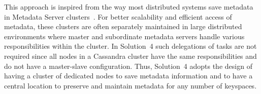  
 This approach is inspired from the way most distributed systems save metadata
 in Metadata Server clusters~\citep{bin-et-al, Fu, lin}. 
 For better scalability and efficient access of metadata,   these clusters are
 often separately maintained in large distributed environments where  master
 and subordinate metadata servers handle various
 responsibilities within the cluster. 
 In Solution~4 such delegations of tasks are not required since all nodes in a
 Cassandra cluster  have the same responsibilities and do not have a
 master-slave configuration.   Thus,  Solution~4  adopts the design of having
 a cluster of dedicated nodes to save metadata information and to have a central
 location to preserve and maintain metadata for any number of keyspaces. 
 